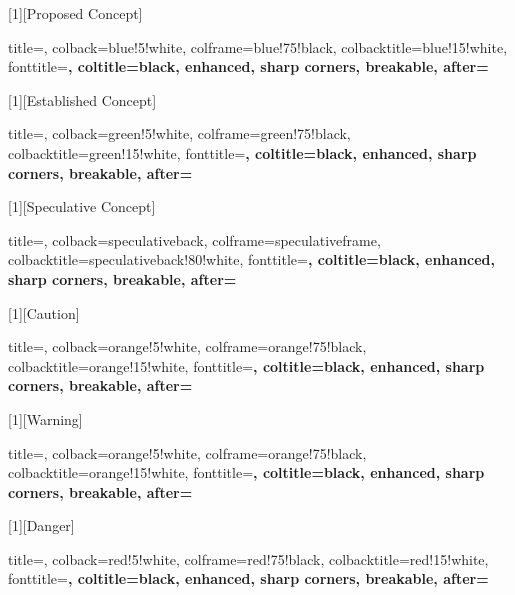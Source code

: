 [1][Proposed Concept]{%
  title=,
  colback=blue!5!white,
  colframe=blue!75!black,
  colbacktitle=blue!15!white,
  fonttitle=\bfseries,
  coltitle=black,
  enhanced, sharp corners, breakable,
  after=\par\vspace{6pt}
}

[1][Established Concept]{%
  title=,
  colback=green!5!white,
  colframe=green!75!black,
  colbacktitle=green!15!white,
  fonttitle=\bfseries,
  coltitle=black,
  enhanced, sharp corners, breakable,
  after=\par\vspace{6pt}
}

[1][Speculative Concept]{%
  title=,
  colback=speculativeback,
  colframe=speculativeframe,
  colbacktitle=speculativeback!80!white, %
  fonttitle=\bfseries,
  coltitle=black,
  enhanced, sharp corners, breakable,
  after=\par\vspace{6pt}
}


[1][Caution]{%
  title=,
  colback=orange!5!white,
  colframe=orange!75!black,
  colbacktitle=orange!15!white,
  fonttitle=\bfseries,
  coltitle=black,
  enhanced, sharp corners, breakable,
  after=\par\vspace{6pt}
}

[1][Warning]{%
  title=,
  colback=orange!5!white,
  colframe=orange!75!black,
  colbacktitle=orange!15!white,
  fonttitle=\bfseries,
  coltitle=black,
  enhanced, sharp corners, breakable,
  after=\par\vspace{6pt}
}

[1][Danger]{%
  title=,
  colback=red!5!white,
  colframe=red!75!black,
  colbacktitle=red!15!white,
  fonttitle=\bfseries,
  coltitle=black,
  enhanced, sharp corners, breakable,
  after=\par\vspace{6pt}
}



